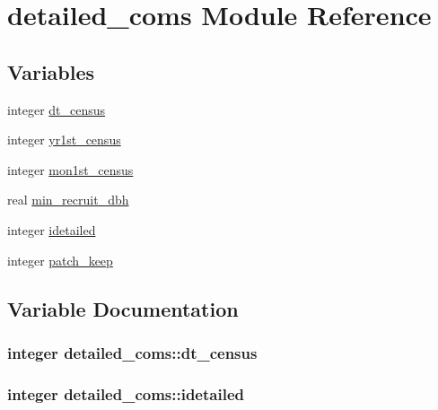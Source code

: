 \hypertarget{namespacedetailed__coms}{}\section{detailed\+\_\+coms Module Reference}
\label{namespacedetailed__coms}
\subsection*{Variables}
\begin{DoxyCompactItemize}
\item 
integer \hyperlink{namespacedetailed__coms_a5d3b59a9d43ec5865a4be92ffdde1982}{dt\+\_\+census}
\item 
integer \hyperlink{namespacedetailed__coms_ad52c2a6c02170c71e22316df2c842b91}{yr1st\+\_\+census}
\item 
integer \hyperlink{namespacedetailed__coms_a7101fa67abae725580d0c44df3fd9845}{mon1st\+\_\+census}
\item 
real \hyperlink{namespacedetailed__coms_af27afe5cb99befa2f9c910987d214757}{min\+\_\+recruit\+\_\+dbh}
\item 
integer \hyperlink{namespacedetailed__coms_a600c197b688f861519c7fc669706c166}{idetailed}
\item 
integer \hyperlink{namespacedetailed__coms_a6541b50f2722b8a83448571dc25934aa}{patch\+\_\+keep}
\end{DoxyCompactItemize}


\subsection{Variable Documentation}
\hypertarget{namespacedetailed__coms_a5d3b59a9d43ec5865a4be92ffdde1982}{}
\subsubsection[{dt\+\_\+census}]{\setlength{\rightskip}{0pt plus 5cm}integer detailed\+\_\+coms\+::dt\+\_\+census}\label{namespacedetailed__coms_a5d3b59a9d43ec5865a4be92ffdde1982}
\hypertarget{namespacedetailed__coms_a600c197b688f861519c7fc669706c166}{}
\subsubsection[{idetailed}]{\setlength{\rightskip}{0pt plus 5cm}integer detailed\+\_\+coms\+::idetailed}\label{namespacedetailed__coms_a600c197b688f861519c7fc669706c166}
\hypertarget{namespacedetailed__coms_af27afe5cb99befa2f9c910987d214757}{}
